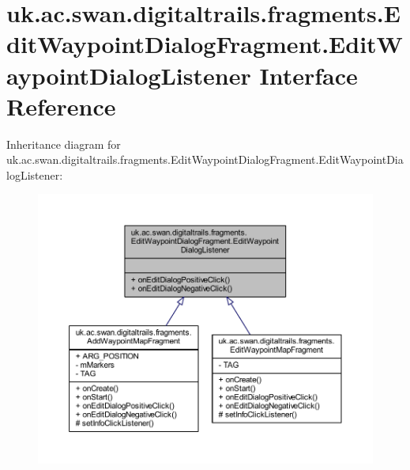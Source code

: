 \hypertarget{interfaceuk_1_1ac_1_1swan_1_1digitaltrails_1_1fragments_1_1_edit_waypoint_dialog_fragment_1_1_edit_waypoint_dialog_listener}{\section{uk.\+ac.\+swan.\+digitaltrails.\+fragments.\+Edit\+Waypoint\+Dialog\+Fragment.\+Edit\+Waypoint\+Dialog\+Listener Interface Reference}
\label{interfaceuk_1_1ac_1_1swan_1_1digitaltrails_1_1fragments_1_1_edit_waypoint_dialog_fragment_1_1_edit_waypoint_dialog_listener}
}


Inheritance diagram for uk.\+ac.\+swan.\+digitaltrails.\+fragments.\+Edit\+Waypoint\+Dialog\+Fragment.\+Edit\+Waypoint\+Dialog\+Listener\+:
\nopagebreak
\begin{figure}[H]
\begin{center}
\leavevmode
\includegraphics[width=350pt]{interfaceuk_1_1ac_1_1swan_1_1digitaltrails_1_1fragments_1_1_edit_waypoint_dialog_fragment_1_1_ed8f84049a2f0e940543fade4cc6b402dd}
\end{center}
\end{figure}


